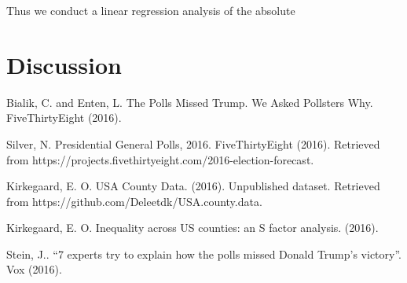 \documentclass[12pt]{article}
\begin{document}
Thus we conduct a linear regression analysis of the absolute 


\section{Discussion} \label{sec:discuss}





\newpage

\begin{thebibliography}{}

 Bialik, C. and Enten, L. The Polls Missed Trump. We Asked Pollsters Why. FiveThirtyEight (2016).

 Silver, N. Presidential General Polls, 2016. FiveThirtyEight (2016). Retrieved from https://projects.fivethirtyeight.com/2016-election-forecast.

 Kirkegaard, E. O. USA County Data. (2016). Unpublished dataset. Retrieved from https://github.com/Deleetdk/USA.county.data.

 Kirkegaard, E. O. Inequality across US counties: an S factor analysis. (2016).

 Stein, J.. ``7 experts try to explain how the polls missed Donald Trump’s victory''. Vox (2016).



\end{thebibliography}
\end{document}
